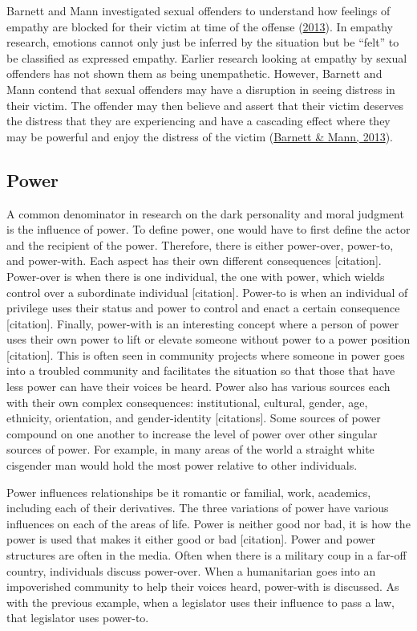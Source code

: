 \documentclass[
  donotrepeattitle,doc, 12pt, a4paper,floatsintext]{apa7}
\begin{document}
Barnett and Mann investigated sexual offenders to understand how feelings of empathy are blocked for their victim at time of the offense (\protect\hyperlink{ref-barnett2013}{2013}). In empathy research, emotions cannot only just be inferred by the situation but be ``felt'' to be classified as expressed empathy. Earlier research looking at empathy by sexual offenders has not shown them as being unempathetic. However, Barnett and Mann contend that sexual offenders may have a disruption in seeing distress in their victim. The offender may then believe and assert that their victim deserves the distress that they are experiencing and have a cascading effect where they may be powerful and enjoy the distress of the victim (\protect\hyperlink{ref-barnett2013}{Barnett \& Mann, 2013}).

\hypertarget{power}{%
\subsection{Power}\label{power}}

A common denominator in research on the dark personality and moral judgment is the influence of power. To define power, one would have to first define the actor and the recipient of the power. Therefore, there is either power-over, power-to, and power-with. Each aspect has their own different consequences {[}citation{]}. Power-over is when there is one individual, the one with power, which wields control over a subordinate individual {[}citation{]}. Power-to is when an individual of privilege uses their status and power to control and enact a certain consequence {[}citation{]}. Finally, power-with is an interesting concept where a person of power uses their own power to lift or elevate someone without power to a power position {[}citation{]}. This is often seen in community projects where someone in power goes into a troubled community and facilitates the situation so that those that have less power can have their voices be heard. Power also has various sources each with their own complex consequences: institutional, cultural, gender, age, ethnicity, orientation, and gender-identity {[}citations{]}. Some sources of power compound on one another to increase the level of power over other singular sources of power. For example, in many areas of the world a straight white cisgender man would hold the most power relative to other individuals.

Power influences relationships be it romantic or familial, work, academics, including each of their derivatives. The three variations of power have various influences on each of the areas of life. Power is neither good nor bad, it is how the power is used that makes it either good or bad {[}citation{]}. Power and power structures are often in the media. Often when there is a military coup in a far-off country, individuals discuss power-over. When a humanitarian goes into an impoverished community to help their voices heard, power-with is discussed. As with the previous example, when a legislator uses their influence to pass a law, that legislator uses power-to.
\end{document}
